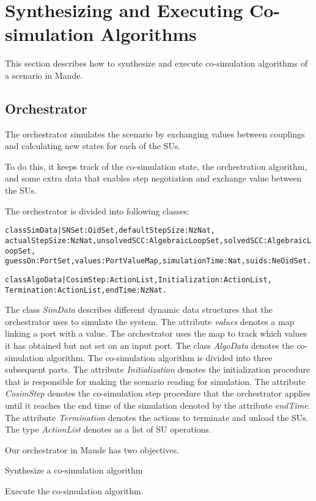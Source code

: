 \section{Synthesizing and Executing Co-simulation Algorithms}\label{sc:sc:synthesize}
This section describes how to synthesize and execute co-simulation algorithms of a scenario in Maude.

\subsection{Orchestrator}
The orchestrator simulates the scenario by exchanging values between couplings and calculating new states for each of the SUs.

To do this, it keeps track of the co-simulation state, the orchestration algorithm, and some extra data that enables step negotiation and exchange value between the SUs.

The orchestrator is divided into following classes:
\begin{alltt}
\small
class SimData | SNSet : OidSet, defaultStepSize : NzNat,
 actualStepSize : NzNat, unsolvedSCC : AlgebraicLoopSet, solvedSCC : AlgebraicLoopSet,
  guessOn : PortSet, values : PortValueMap, simulationTime : Nat,suids : NeOidSet .

class AlgoData | CosimStep : ActionList, Initialization : ActionList, 
Termination : ActionList, endTime : NzNat .
\end{alltt}

The class \textit{SimData} describes different dynamic data structures that the orchestrator uses to simulate the system. 
The attribute \textit{values} denotes a map linking a port with a value. 
The orchestrator uses the map to track which values it has obtained but not set on an input port. 
The class \textit{AlgoData} denotes the co-simulation algorithm.
The co-simulation algorithm is divided into three subsequent parts.
The attribute \textit{Initialization} denotes the initialization procedure that is responsible for making the scenario reading for simulation.
The attribute \textit{CosimStep} denotes the co-simulation step procedure that the orchestrator applies until it reaches the end time of the simulation denoted by the attribute \textit{endTime}.
The attribute \textit{Termination} denotes the actions to terminate and unload the SUs.
The type \textit{ActionList} denotes as a list of SU operations.

Our orchestrator in Maude has two objectives.
\begin{compactenum}
  \item Synthesize a co-simulation algorithm
  \item Execute the co-simulation algorithm.
\end{compactenum}


